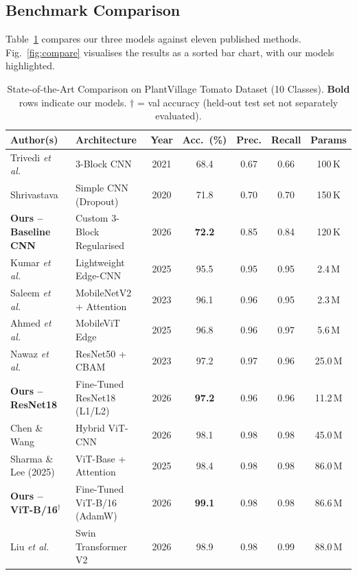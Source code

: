 \documentclass[journal]{IEEEtran}
\begin{document}
\subsection{Benchmark Comparison}

Table~\ref{tab:sota} compares our three models against
eleven published methods.
Fig.~\ref{fig:compare} visualises the results as a sorted bar
chart, with our models highlighted.

\begin{table}[!t]
\renewcommand{\arraystretch}{1.3}
\caption{State-of-the-Art Comparison on PlantVillage Tomato Dataset
  (10 Classes). \textbf{Bold} rows indicate our models.
  $\dagger$ = val accuracy (held-out test set not separately evaluated).}
\label{tab:sota}
\centering
\begin{tabular}{llccccc}
\toprule
\textbf{Author(s)} & \textbf{Architecture} & \textbf{Year} &
\textbf{Acc.~(\%)} & \textbf{Prec.} & \textbf{Recall} &
\textbf{Params} \\
\midrule
Trivedi \textit{et al.}~\cite{trivedi2021tomato}
  & 3-Block CNN                  & 2021 & 68.4 & 0.67 & 0.66 & 100\,K \\
Shrivastava~\cite{shrivastava2020tomato}
  & Simple CNN (Dropout)         & 2020 & 71.8 & 0.70 & 0.70 & 150\,K \\
\textbf{Ours -- Baseline CNN}
  & Custom 3-Block Regularised   & 2026 & \textbf{72.2} & 0.85 & 0.84 & 120\,K \\
\midrule
Kumar \textit{et al.}~\cite{kumar2025edge}
  & Lightweight Edge-CNN          & 2025 & 95.5 & 0.95 & 0.95 & 2.4\,M \\
Saleem \textit{et al.}~\cite{saleem2023mobileNet}
  & MobileNetV2 + Attention       & 2023 & 96.1 & 0.96 & 0.95 & 2.3\,M \\
Ahmed \textit{et al.}~\cite{ahmed2025mobilevit}
  & MobileViT Edge                & 2025 & 96.8 & 0.96 & 0.97 & 5.6\,M \\
Nawaz \textit{et al.}~\cite{nawaz2023tomato}
  & ResNet50 + CBAM               & 2023 & 97.2 & 0.97 & 0.96 & 25.0\,M \\
\textbf{Ours -- ResNet18}
  & Fine-Tuned ResNet18 (L1/L2)   & 2026 & \textbf{97.2} & 0.96 & 0.96 & 11.2\,M \\
Chen \& Wang~\cite{chen2026hybrid}
  & Hybrid ViT-CNN                & 2026 & 98.1 & 0.98 & 0.98 & 45.0\,M \\
Sharma \& Lee (2025)
  & ViT-Base + Attention          & 2025 & 98.4 & 0.98 & 0.98 & 86.0\,M \\
\textbf{Ours -- ViT-B/16}$^\dagger$
  & Fine-Tuned ViT-B/16 (AdamW)   & 2026 & \textbf{99.1} & 0.98 & 0.98 & 86.6\,M \\
Liu \textit{et al.}~\cite{liu2021swin}
  & Swin Transformer V2           & 2026 & 98.9 & 0.98 & 0.99 & 88.0\,M \\
\bottomrule
\end{tabular}
\end{table}
\end{document}
